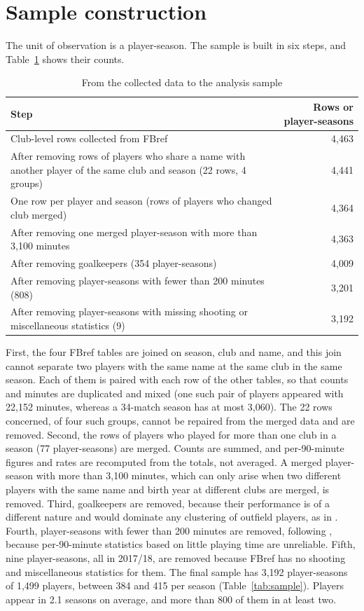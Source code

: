 \section{Sample construction}
\label{sec:data-sample}

The unit of observation is a player-season. The sample is built in six steps, and Table~\ref{tab:sample-steps} shows their counts.

\begin{table}[ht]
	\centering
	\small
	\caption{From the collected data to the analysis sample}
	\label{tab:sample-steps}
	\begin{tabular}{p{11.2cm}r}
		\toprule
		Step & Rows or player-seasons \\
		\midrule
		Club-level rows collected from FBref & 4,463 \\
		After removing rows of players who share a name with another player of the same club and season (22 rows, 4 groups) & 4,441 \\
		One row per player and season (rows of players who changed club merged) & 4,364 \\
		After removing one merged player-season with more than 3,100 minutes & 4,363 \\
		After removing goalkeepers (354 player-seasons) & 4,009 \\
		After removing player-seasons with fewer than 200 minutes (808) & 3,201 \\
		After removing player-seasons with missing shooting or miscellaneous statistics (9) & 3,192 \\
		\bottomrule
	\end{tabular}
\end{table}

First, the four FBref tables are joined on season, club and name, and this join cannot separate two players with the same name at the same club in the same season. Each of them is paired with each row of the other tables, so that counts and minutes are duplicated and mixed (one such pair of players appeared with 22,152 minutes, whereas a 34-match season has at most 3,060). The 22 rows concerned, of four such groups, cannot be repaired from the merged data and are removed. Second, the rows of players who played for more than one club in a season (77 player-seasons) are merged. Counts are summed, and per-90-minute figures and rates are recomputed from the totals, not averaged. A merged player-season with more than 3,100 minutes, which can only arise when two different players with the same name and birth year at different clubs are merged, is removed. Third, goalkeepers are removed, because their performance is of a different nature and would dominate any clustering of outfield players, as in . Fourth, player-seasons with fewer than 200 minutes are removed, following , because per-90-minute statistics based on little playing time are unreliable. Fifth, nine player-seasons, all in 2017/18, are removed because FBref has no shooting and miscellaneous statistics for them. The final sample has 3,192 player-seasons of 1,499 players, between 384 and 415 per season (Table~\ref{tab:sample}). Players appear in 2.1 seasons on average, and more than 800 of them in at least two.

